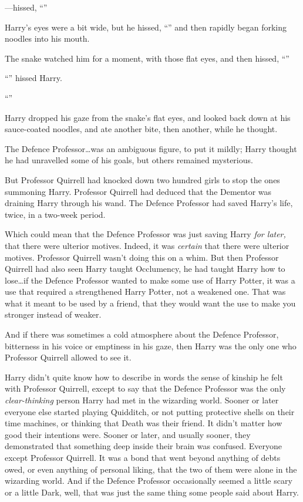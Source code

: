 —hissed, “”

Harry’s eyes were a bit wide, but he hissed, “” and then rapidly began forking noodles into his mouth.

The snake watched him for a moment, with those flat eyes, and then hissed, “”

“” hissed Harry.

“”

Harry dropped his gaze from the snake’s flat eyes, and looked back down at his sauce-coated noodles, and ate another bite, then another, while he thought.

The Defence Professor…was an ambiguous figure, to put it mildly; Harry thought he had unravelled some of his goals, but others remained mysterious.

But Professor Quirrell had knocked down two hundred girls to stop the ones summoning Harry. Professor Quirrell had deduced that the Dementor was draining Harry through his wand. The Defence Professor had saved Harry’s life, twice, in a two-week period.

Which could mean that the Defence Professor was just saving Harry \emph{for later,} that there were ulterior motives. Indeed, it was \emph{certain} that there were ulterior motives. Professor Quirrell wasn’t doing this on a whim. But then Professor Quirrell had also seen Harry taught Occlumency, he had taught Harry how to lose…if the Defence Professor wanted to make some use of Harry Potter, it was a use that required a strengthened Harry Potter, not a weakened one. That was what it meant to be used by a friend, that they would want the use to make you stronger instead of weaker.

And if there was sometimes a cold atmosphere about the Defence Professor, bitterness in his voice or emptiness in his gaze, then Harry was the only one who Professor Quirrell allowed to see it.

Harry didn’t quite know how to describe in words the sense of kinship he felt with Professor Quirrell, except to say that the Defence Professor was the only \emph{clear-thinking} person Harry had met in the wizarding world. Sooner or later everyone else started playing Quidditch, or not putting protective shells on their time machines, or thinking that Death was their friend. It didn’t matter how good their intentions were. Sooner or later, and usually sooner, they demonstrated that something deep inside their brain was confused. Everyone except Professor Quirrell. It was a bond that went beyond anything of debts owed, or even anything of personal liking, that the two of them were alone in the wizarding world. And if the Defence Professor occasionally seemed a little scary or a little Dark, well, that was just the same thing some people said about Harry.

